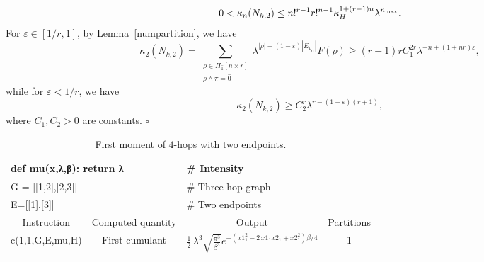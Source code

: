 \documentclass[12pt]{article}
\newenvironment{Proof}{\removelastskip\par\medskip
\noindent{\em Proof.} \rm}{\penalty-20\null\hfill$\square$\par\medbreak}
\numberwithin{equation}{section}
\begin{document}
\begin{Proof}
\begin{eqnarray*}
0<\kappa_n(N_{k,2})\leq n!^{r-1}r!^{n-1}\kappa_H^{1+(r-1)n} \lambda^{n_{{\rm max}}}.
\end{eqnarray*}
For $ \varepsilon \in [ 1/r , 1]$, by Lemma~\ref{numpartition}, we have
$$ 
\kappa_2(N_{k,2}) =
\sum_{\substack{\rho\in\Pi_{\widehat{1}}[n\times r]\\\rho\wedge\pi=\widehat{0}}}\lambda^{|\rho|-
  ( 1 - \varepsilon ) |E_{\rho_G}|}F(\rho)
\geq (r-1)r C_1^{2r} \lambda^{-n + (1+nr)\varepsilon },
$$ 
 while for $\varepsilon < 1/r $, we have
\begin{equation}
\nonumber
\kappa_2(N_{k,2})\geq C_2^r \lambda^{r- ( 1 - \varepsilon ) (r+1)},
\end{equation}
 where $C_1,C_2>0$ are constants. 
\end{Proof} 
 \begin{table}[H] 
  \centering
      {
  \begin{tabular}{|ll|ll|} %
 \hline
 \multicolumn{2}{|l}{
def mu(x,λ,β): return λ
}
  & \multicolumn{2}{l|}{\# Intensity}   
 \\
 \hline
 \multicolumn{2}{|l}{
G = [[1,2],[2,3]]
}
  & \multicolumn{2}{l|}{\# Three-hop graph} 
 \\
 \hline
 \multicolumn{2}{|l}{
 E=[[1],[3]]
} 
 & \multicolumn{2}{l|}{\# Two endpoints}   
 \\
\hline
\hline
\multicolumn{1}{|c|}{Instruction} & \multicolumn{1}{c|}{Computed quantity} & \multicolumn{1}{c|}{Output} & \multicolumn{1}{c|}{Partitions} 
 \\ 
 \hline
\multicolumn{1}{|c|}{c(1,1,G,E,mu,H)} & \multicolumn{1}{c|}{First cumulant} & \multicolumn{1}{c|}{$\frac{1}{2} \, {\lambda}^{3} \sqrt{\frac{\pi^{3}}{{\beta}^{3}}} e^{- {\left(\mathit{x1}_{1}^{2} - 2 \, \mathit{x1}_{1} \mathit{x2}_{1} + \mathit{x2}_{1}^{2}\right)} {\beta} / 4 }$} & \multicolumn{1}{c|}{1} 
\\ %
\hline
\end{tabular}
}
\caption{First moment of $4$-hops with two endpoints.} 
\end{table} 

\vspace{-0.8cm}
\end{document}
